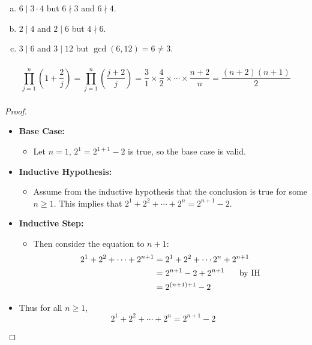 \documentclass[class=article, crop=false]{standalone}
\begin{document}
\subsubsection{}
\begin{enumerate}[(a)]
	\item
	$6\mid 3\cdot4$ but $6\nmid 3$ and $6\nmid 4$.
	
	\item
	$2\mid 4$ and $2\mid 6$ but $4\nmid 6$.
	
	\item
	$3\mid 6$ and $3\mid 12$ but $\gcd(6,12)=6\neq 3$.

\end{enumerate}

\subsubsection{}
$$\prod_{j=1}^{n}\left(1+\frac{2}{j}\right)= \prod_{j=1}^{n}\left(\frac{j+2}{j}\right) = \frac{3}{1}\times\frac{4}{2}\times\cdots\times\frac{n+2}{n} = \frac{(n+2)(n+1)}{2}$$

\subsubsection{}
\begin{proof}
	$ $
	\begin{itemize}
		\item[] \textbf{Base Case:}
		\begin{itemize}
			\item[] Let $n=1$, $2^1=2^{1+1}-2$ is true, so the base case is valid.
		\end{itemize}
		\item[] \textbf{Inductive Hypothesis:}
		\begin{itemize}
			\item[] Assume from the inductive hypothesis that the conclusion is true for some $n\geq 1$.
			This implies that $2^1+2^2+\cdots+2^n=2^{n+1}-2$.
		\end{itemize}
		\item[] \textbf{Inductive Step:}
		\begin{itemize}
			\item[] Then consider the equation to $n+1$:
			\begin{align*}
				2^1+2^2+\cdots+2^{n+1} &= 2^1+2^2+\cdots2^n+2^{n+1} \\
				&= 2^{n+1}-2 + 2^{n+1} \hspace{5mm}\text{ by IH} \\
				&= 2^{(n+1)+1}-2
			\end{align*}
		\end{itemize}
		\item[] Thus for all $n\geq 1$, $$2^1+2^2+\cdots+2^n=2^{n+1}-2$$    
	\end{itemize}
\end{proof}
\end{document}

